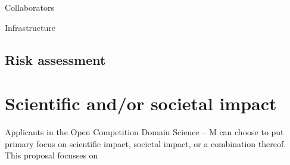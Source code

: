 \documentclass[a4paper,10pt,fleqn]{application}
\begin{document}
Collaborators

Infrastructure


\subsection{Risk assessment}

\newpage
\section{Scientific and/or societal impact}

Applicants in the Open Competition Domain Science – M can choose to put primary focus on scientific impact, societal impact, or a combination thereof. This proposal focusses on %


\end{document}
